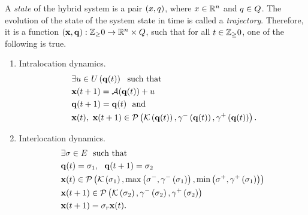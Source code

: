 A \emph{state} of the hybrid system is a pair $(x,q)$, where
$x\in\mathbb{R}^n$ and $q\in Q$.  The evolution of the
state of the system state in time is called a \emph{trajectory}.
Therefore, it
is a function
$\left({\bf x},{\bf q}\right):\mathbb{Z}_\geq 0\rightarrow\mathbb{R}^n\times Q$, such
that for all $t\in\mathbb{Z}_\geq 0$, one of the following is true.

\begin{enumerate}
\item Intralocation dynamics.
\begin{align}~\label{eqn:intralocation}
\begin{split}
& \exists u\in U\left({\bf q}(t)\right)~~\text{such that}\\
& {\bf x}(t+1) = \mathcal{A}({\bf q}(t))+u\\ 
& {\bf q}(t+1) = {\bf q}(t)~~
\text{and}\\
& {\bf x}(t),~{\bf x}(t+1)\in\mathcal{P}\left(\mathcal{K}\left({\bf q}(t)\right),\gamma^-\left({\bf q}(t)\right),\gamma^+\left({\bf q}(t)\right)\right).
\end{split}
\end{align}
\item Interlocation dynamics.
\begin{align} 
\begin{split}
& \exists \sigma\in E~~\text{such that}\\
& {\bf q}(t)=\sigma_{1},~~{\bf q}(t+1)=\sigma_{2}\\
& {\bf x}(t)\in\mathcal{P}\left(\mathcal{K}\left(\sigma_{1}\right),\max\left(\sigma^-,\gamma^-\left(\sigma_{1}\right)\right),\min\left(\sigma^+,\gamma^+\left(\sigma_{1}\right)\right)\right) \\
& {\bf x}(t+1)\in \mathcal{P}\left(\mathcal{K}\left(\sigma_{2}\right),\gamma^-\left(\sigma_{2}\right),\gamma^+\left(\sigma_{2}\right)\right)\\
& {\bf x}(t+1) = \sigma_r{\bf x}(t).
\end{split}
\end{align}
\end{enumerate}

